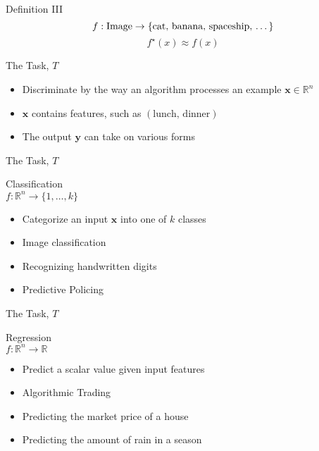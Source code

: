 \begin{slide}{Definition III}
  $$f: \text{Image} \rightarrow \{\text{cat, banana, spaceship, \dots}\}$$
  \vspace{0.5cm}
  \pause
  $$f^\star(x) \approx f(x)$$
\end{slide}

\begin{slide}{The Task, $T$}
\begin{itemize}
  \pause\item Discriminate by the way an algorithm processes an example $\textbf{x} \in \mathbb{R}^n$
  \pause\item $\textbf{x}$ contains features, such as $(\text{lunch, dinner})$ %
  \pause\item The output $\textbf{y}$ can take on various forms
\end{itemize}
\end{slide}

\begin{slide}{The Task, $T$}
  \begin{center}
    {\Large
    Classification}\\
    \vspace{0.3cm}
    $f: \mathbb{R}^n \rightarrow \{1, \dots, k\}$
  \end{center}
  \begin{itemize}
    \pause\item Categorize an input $\textbf{x}$ into one of $k$ classes
    \pause\item Image classification
    \pause\item Recognizing handwritten digits
    \pause\item Predictive Policing %
  \end{itemize}
\end{slide}

\begin{slide}{The Task, $T$}
  \begin{center}
    {\Large
    Regression}\\
    \vspace{0.3cm}
    $f: \mathbb{R}^n \rightarrow \mathbb{R}$
  \end{center}
  \begin{itemize}
    \pause\item Predict a scalar value given input features
    \pause\item Algorithmic Trading %
    \pause\item Predicting the market price of a house %
    \pause\item Predicting the amount of rain in a season
  \end{itemize}
\end{slide}

